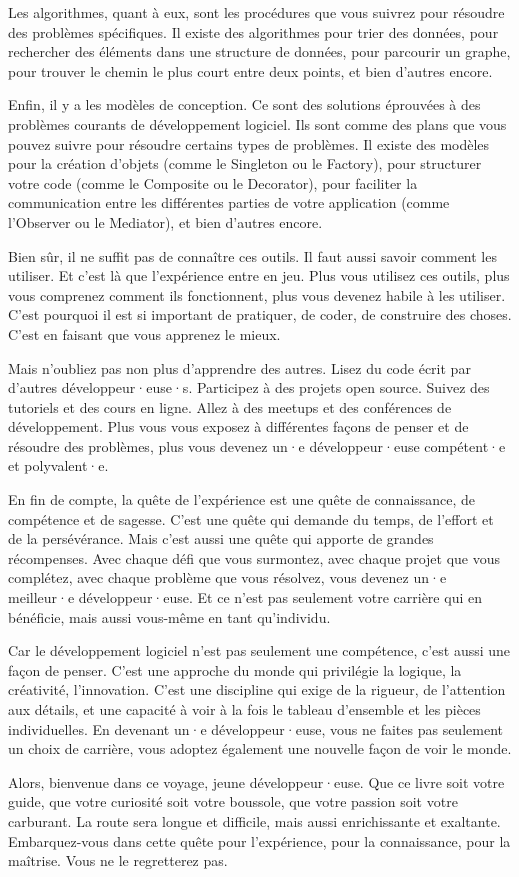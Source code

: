 Les algorithmes, quant à eux, sont les procédures que vous suivrez pour résoudre des problèmes spécifiques. Il existe des algorithmes pour trier des données, pour rechercher des éléments dans une structure de données, pour parcourir un graphe, pour trouver le chemin le plus court entre deux points, et bien d'autres encore.

Enfin, il y a les modèles de conception. Ce sont des solutions éprouvées à des problèmes courants de développement logiciel. Ils sont comme des plans que vous pouvez suivre pour résoudre certains types de problèmes. Il existe des modèles pour la création d'objets (comme le Singleton ou le Factory), pour structurer votre code (comme le Composite ou le Decorator), pour faciliter la communication entre les différentes parties de votre application (comme l'Observer ou le Mediator), et bien d'autres encore.

Bien sûr, il ne suffit pas de connaître ces outils. Il faut aussi savoir comment les utiliser. Et c'est là que l'expérience entre en jeu. Plus vous utilisez ces outils, plus vous comprenez comment ils fonctionnent, plus vous devenez habile à les utiliser. C'est pourquoi il est si important de pratiquer, de coder, de construire des choses. C'est en faisant que vous apprenez le mieux.

Mais n'oubliez pas non plus d'apprendre des autres. Lisez du code écrit par d'autres développeur·euse·s. Participez à des projets open source. Suivez des tutoriels et des cours en ligne. Allez à des meetups et des conférences de développement. Plus vous vous exposez à différentes façons de penser et de résoudre des problèmes, plus vous devenez un·e développeur·euse compétent·e et polyvalent·e.

En fin de compte, la quête de l'expérience est une quête de connaissance, de compétence et de sagesse. C'est une quête qui demande du temps, de l'effort et de la persévérance. Mais c'est aussi une quête qui apporte de grandes récompenses. Avec chaque défi que vous surmontez, avec chaque projet que vous complétez, avec chaque problème que vous résolvez, vous devenez un·e meilleur·e développeur·euse. Et ce n'est pas seulement votre carrière qui en bénéficie, mais aussi vous-même en tant qu'individu.

Car le développement logiciel n'est pas seulement une compétence, c'est aussi une façon de penser. C'est une approche du monde qui privilégie la logique, la créativité, l'innovation. C'est une discipline qui exige de la rigueur, de l'attention aux détails, et une capacité à voir à la fois le tableau d'ensemble et les pièces individuelles. En devenant un·e développeur·euse, vous ne faites pas seulement un choix de carrière, vous adoptez également une nouvelle façon de voir le monde.

Alors, bienvenue dans ce voyage, jeune développeur·euse. Que ce livre soit votre guide, que votre curiosité soit votre boussole, que votre passion soit votre carburant. La route sera longue et difficile, mais aussi enrichissante et exaltante. Embarquez-vous dans cette quête pour l'expérience, pour la connaissance, pour la maîtrise. Vous ne le regretterez pas.